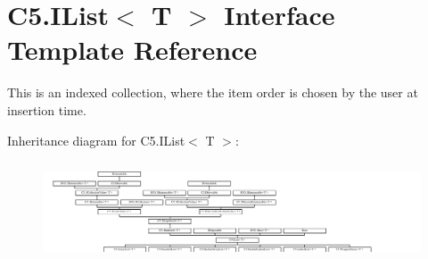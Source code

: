 \hypertarget{interface_c5_1_1_i_list}{}\section{C5.\+I\+List$<$ T $>$ Interface Template Reference}
\label{interface_c5_1_1_i_list}


This is an indexed collection, where the item order is chosen by the user at insertion time.  


Inheritance diagram for C5.\+I\+List$<$ T $>$\+:\begin{figure}[H]
\begin{center}
\leavevmode
\includegraphics[height=2.957747cm]{interface_c5_1_1_i_list}
\end{center}
\end{figure}
